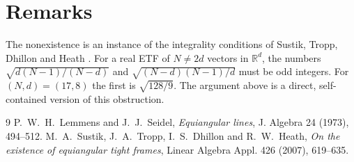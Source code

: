 \documentclass[11pt]{article}
\theoremstyle{plain}
\theoremstyle{definition}
\theoremstyle{remark}
\begin{document}
\section{Remarks}

The nonexistence is an instance of the integrality conditions of Sustik,
Tropp, Dhillon and Heath \cite{stdh}. For a real ETF of $N\ne2d$ vectors in
$\mathbb R^d$, the numbers $\sqrt{d(N-1)/(N-d)}$ and $\sqrt{(N-d)(N-1)/d}$ must be
odd integers. For $(N,d)=(17,8)$ the first is $\sqrt{128/9}$. The argument above
is a direct, self-contained version of this obstruction.

\begin{thebibliography}{9}
 P.~W.~H.~Lemmens and J.~J.~Seidel, \emph{Equiangular lines},
  J. Algebra 24 (1973), 494--512.
 M.~A.~Sustik, J.~A.~Tropp, I.~S.~Dhillon and R.~W.~Heath,
  \emph{On the existence of equiangular tight frames}, Linear Algebra Appl.
  426 (2007), 619--635.
\end{thebibliography}
\end{document}
